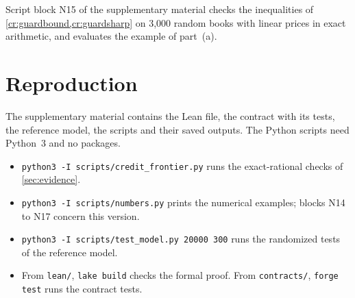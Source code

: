 Script block N15 of the supplementary material checks the inequalities of \cref{cr:guardbound,cr:guardsharp} on 3{,}000 random books with linear prices in exact arithmetic, and evaluates the example of part~(a).


\section{Reproduction}\label{app:repro}

The supplementary material contains the Lean file, the contract with its tests, the reference model, the scripts and their saved outputs. The Python scripts need Python~3 and no packages.
\begin{sloppypar}
\begin{itemize}
\item \texttt{python3 -I scripts/credit\_frontier.py} runs the exact-rational checks of \cref{sec:evidence}.
\item \texttt{python3 -I scripts/numbers.py} prints the numerical examples; blocks N14 to N17 concern this version.
\item \texttt{python3 -I scripts/test\_model.py 20000 300} runs the randomized tests of the reference model.
\item From \texttt{lean/}, \texttt{lake build} checks the formal proof. From \texttt{contracts/}, \texttt{forge test} runs the contract tests.
\end{itemize}
\end{sloppypar}
